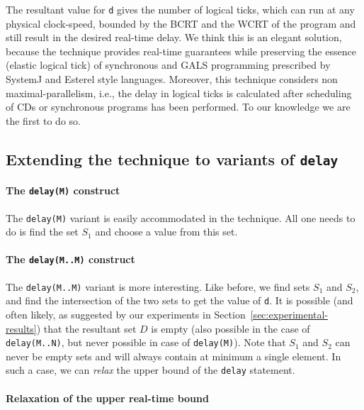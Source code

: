 The resultant value for \texttt{d} gives the number of logical ticks,
which can run at any physical clock-speed, bounded by the BCRT and the
WCRT of the program and still result in the desired real-time delay. We
think this is an elegant solution, because the technique provides
real-time guarantees while preserving the essence (elastic logical tick)
of synchronous and GALS programming prescribed by SystemJ and Esterel
style languages. Moreover, this technique considers non
maximal-parallelism, i.e., the delay in logical ticks is calculated
after scheduling of CDs or synchronous programs has been performed. To
our knowledge we are the first to do so.

\subsection{Extending the technique to variants of \texttt{delay}}
\label{sec:extend-tehcn-vari}

\paragraph{The \texttt{delay(M)} construct}
\label{sec:extend-techn-vari}

The \texttt{delay(M)} variant is easily accommodated in the
technique. All one needs to do is find the set $S_1$ and choose a value
from this set.

\paragraph{The \texttt{delay(M..M)} construct}
\label{sec:extend-techn-vari}

The \texttt{delay(M..M)} variant is more interesting. Like before, we
find sets $S_1$ and $S_2$, and find the intersection of the two sets to
get the value of \texttt{d}. It is possible (and often likely, as
suggested by our experiments in Section~\ref{sec:experimental-results})
that the resultant set $D$ is empty (also possible in the case of
\texttt{delay(M..N)}, but never possible in case of
\texttt{delay(M)}). Note that $S_1$ and $S_2$ can never be empty sets
and will always contain at minimum a single element. In such a case, we
can \textit{relax} the upper bound of the \texttt{delay} statement.

\paragraph{Relaxation of the upper real-time bound}
\label{sec:over-appr-relax}


